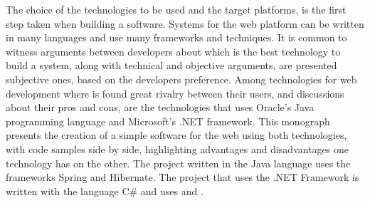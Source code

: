 The choice of the technologies to be used and the target platforms, is the first step taken when building a software. Systems for the web platform  can be written in many languages and use many frameworks and techniques. It is common to witness arguments between developers about which is the best technology to build a system, along with technical and objective arguments, are presented subjective ones, based on the developers preference. Among technologies for web development where is found great rivalry between their users, and discussions about their pros and cons, are the technologies that uses Oracle's Java programming language and Microsoft's .NET framework. This monograph presents the creation of a simple software for the web using both technologies, with code samples side by side, highlighting advantages and disadvantages one technology has on the other. The project written in the Java language uses the frameworks Spring and Hibernate. The project that uses the .NET Framework is written with the language C\# and uses  and .
